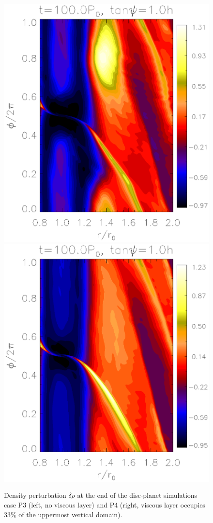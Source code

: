 \begin{figure}
   \centering
   \includegraphics[scale=.39,clip=true,trim=0cm 1.84cm 0cm
     0cm]{figures/jup0_3h_pdisk010}\includegraphics[scale=.39,clip=true,trim=2.3cm
     1.84cm 0cm
     0cm]{figures/jup1_3h_pdisk008}
   \caption{Density perturbation $\delta\rho$ at the end of the
     disc-planet simulations case P3 (left, no viscous layer) and P4
     (right, viscous layer occupies $33\%$ of the uppermost vertical
     domain).   
     \label{jup0_3h}}
\end{figure}
 

